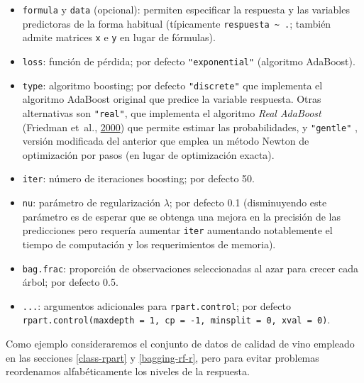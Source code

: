 \documentclass[
  spanish,
]{book}
\newenvironment{Shaded}{\begin{snugshade}}{\end{snugshade}}
\newcommand{\CommentTok}[1]{\textcolor[rgb]{0.56,0.35,0.01}{\textit{#1}}}
\newcommand{\DecValTok}[1]{\textcolor[rgb]{0.00,0.00,0.81}{#1}}
\newcommand{\FloatTok}[1]{\textcolor[rgb]{0.00,0.00,0.81}{#1}}
\newcommand{\KeywordTok}[1]{\textcolor[rgb]{0.13,0.29,0.53}{\textbf{#1}}}
\newcommand{\NormalTok}[1]{#1}
\newcommand{\OperatorTok}[1]{\textcolor[rgb]{0.81,0.36,0.00}{\textbf{#1}}}
\newcommand{\StringTok}[1]{\textcolor[rgb]{0.31,0.60,0.02}{#1}}
\theoremstyle{break}
\theoremstyle{definition}
\theoremstyle{definition}
\theoremstyle{definition}
\theoremstyle{remark}
\begin{document}
\begin{itemize}
\item
  \texttt{formula} y \texttt{data} (opcional): permiten especificar la respuesta y las variables predictoras de la forma habitual (típicamente \texttt{respuesta\ \textasciitilde{}\ .}; también admite matrices \texttt{x} e \texttt{y} en lugar de fórmulas).
\item
  \texttt{loss}: función de pérdida; por defecto \texttt{"exponential"} (algoritmo AdaBoost).
\item
  \texttt{type}: algoritmo boosting; por defecto \texttt{"discrete"} que implementa el algoritmo AdaBoost original que predice la variable respuesta. Otras alternativas son \texttt{"real"}, que implementa el algoritmo \emph{Real AdaBoost} (Friedman et~al., \protect\hyperlink{ref-friedman2000additive}{2000}) que permite estimar las probabilidades, y \texttt{"gentle"} , versión modificada del anterior que emplea un método Newton de optimización por pasos (en lugar de optimización exacta).
\item
  \texttt{iter}: número de iteraciones boosting; por defecto 50.
\item
  \texttt{nu}: parámetro de regularización \(\lambda\); por defecto 0.1 (disminuyendo este parámetro es de esperar que se obtenga una mejora en la precisión de las predicciones pero requería aumentar \texttt{iter} aumentando notablemente el tiempo de computación y los requerimientos de memoria).
\item
  \texttt{bag.frac}: proporción de observaciones seleccionadas al azar para crecer cada árbol; por defecto 0.5.
\item
  \texttt{...}: argumentos adicionales para \texttt{rpart.control}; por defecto \texttt{rpart.control(maxdepth\ =\ 1,\ cp\ =\ -1,\ minsplit\ =\ 0,\ xval\ =\ 0)}.
\end{itemize}

Como ejemplo consideraremos el conjunto de datos de calidad de vino empleado en las secciones \ref{class-rpart} y \ref{bagging-rf-r}, pero para evitar problemas reordenamos alfabéticamente los niveles de la respuesta.

\begin{Shaded}
\end{Shaded}
\end{document}
